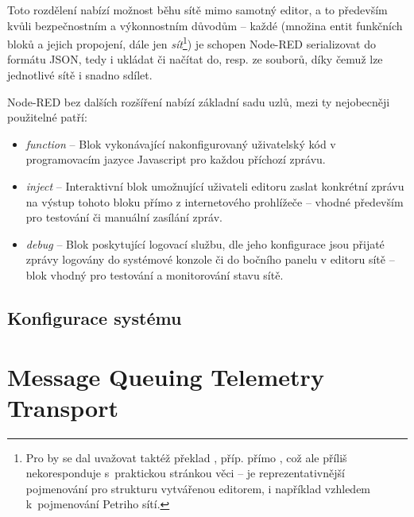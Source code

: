 Toto rozdělení nabízí možnost běhu sítě mimo samotný editor, a to především kvůli bezpečnostním a
výkonnostním důvodům -- každé  (množina entit funkčních bloků a jejich propojení, dále jen
\emph{sít}\footnote{Pro  by se dal uvažovat taktéž překlad ,
příp. přímo , což ale příliš nekoresponduje s~praktickou stránkou věci --  je reprezentativnější
pojmenování pro strukturu vytvářenou editorem, i například vzhledem k~pojmenování Petriho sítí.}) je schopen
Node-RED serializovat do formátu JSON, tedy i ukládat či načítat do, resp. ze souborů, díky čemuž lze jednotlivé sítě i snadno sdílet.


Node-RED bez dalších rozšíření nabízí základní sadu uzlů, mezi ty nejobecněji použitelné patří:

\begin{itemize}
    \item\emph{function} -- Blok vykonávající nakonfigurovaný uživatelský kód v programovacím jazyce Javascript pro
    každou příchozí zprávu.
    \item\emph{inject} -- Interaktivní blok umožnující uživateli editoru zaslat konkrétní zprávu na výstup tohoto bloku
    přímo z internetového prohlížeče -- vhodné především pro testování či manuální zasílání zpráv.
    \item\emph{debug} -- Blok poskytující logovací službu, dle jeho konfigurace jsou přijaté zprávy logovány do systémové konzole či do
    bočního panelu v editoru sítě -- blok vhodný pro testování a monitorování stavu sítě.
\end{itemize}

\subsection{Konfigurace systému}


\section{Message Queuing Telemetry Transport}
